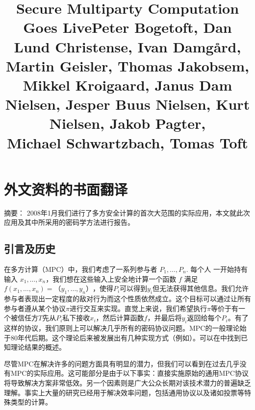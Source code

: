 \chapter{外文资料的书面翻译}


\title{\large Secure Multiparty Computation Goes Live}
\title{\small Peter Bogetoft, Dan Lund Christense, Ivan Damg\aa rd, Martin Geisler, Thomas Jakobsem,\\Mikkel Kroigaard, Janus Dam Nielsen, Jesper Buus Nielsen, Kurt Nielsen, Jakob Pagter,\\Michael Schwartzbach, Tomas Toft}

{\heiti 摘要：} 2008年1月我们进行了多方安全计算的首次大范围的实际应用，本文就此次应用及其中所采用的密码学方法进行报告。

\section{引言及历史}
在多方计算（MPC）中，我们考虑了一系列参与者 $P_1,\dots,P_n$. 每个人
一开始持有输入 $x_1,\dots,x_n$，我们想在这些输入上安全地计算一个函数 $f$ 满足$f(x_1,\dots,x_n)=（y_1,\dots,y_n）$，使得$P_i$可以得到$y_i$但无法获得其他信息。我们允许参与者表现出一定程度的敌对行为而这个性质依然成立。这个目标可以通过让所有参与者遵从某个协议$\pi$进行交互来实现。直觉上来说，我们希望执行$\pi$等价于有一个被信任方$T$先从$P_i$私下接收$x_i$，然后计算函数$f$，并最后将$y_i$返回给每个$P_i$。有了这样的协议，我们原则上可以解决几乎所有的密码协议问题。MPC的一般理论始于80年代后期。这个理论后来被发展出有几种实现方式（例如）。可以在中找到已知理论结果的概述。

尽管MPC在解决许多的问题方面具有明显的潜力，但我们可以看到在过去几乎没有MPC的实际应用。这可能部分是由于以下事实：直接实施原始的通用MPC协议将导致解决方案非常低效。另一个因素则是广大公众长期对该技术潜力的普遍缺乏理解。事实上大量的研究已经用于解决效率问题，包括通用协议以及诸如投票等特殊类型的计算。


